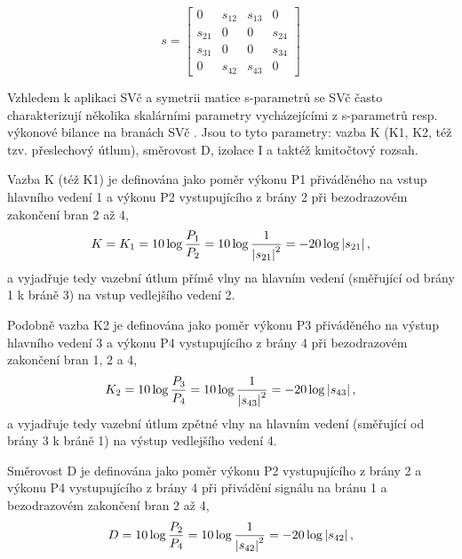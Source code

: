        \begin{equation}\label{RA:eq_smith09}
          s = \left[
            \begin{matrix}
                0    & s_{12} & s_{13} &  0       \\
              s_{21} &   0    &   0    & s_{24}   \\
              s_{31} &   0    &   0    & s_{34}   \\
                0    & s_{42} & s_{43} &  0     
            \end{matrix}
              \right]
        \end{equation} 
  
        Vzhledem k aplikaci SVč a symetrii matice s-parametrů se SVč často charakterizují několika skalárními 
        parametry vycházejícími z s-parametrů resp. výkonové bilance na branách SVč . Jsou to tyto parametry: 
        vazba K (K1, K2, též tzv. přeslechový útlum), směrovost D, izolace I a taktéž kmitočtový rozsah.
  
        Vazba K (též K1) je definována jako poměr výkonu P1 přiváděného na vstup hlavního vedení 1 a výkonu 
        P2 vystupujícího z brány 2 při bezodrazovém zakončení bran 2 až 4,
        \begin{equation}\label{RA:eq_smith10}
          K = K_1 = 10\log\frac{P_1}{P_2} 
                  = 10\log\frac{1}{\left\lvert s_{21}\right\rvert^2} = -20\log\left\lvert s_{21}\right\rvert,  
        \end{equation} 
        a vyjadřuje tedy vazební útlum přímé vlny na hlavním vedení (směřující od brány 1 k bráně 3) na vstup 
        vedlejšího vedení 2.
  
        Podobně vazba K2 je definována jako poměr výkonu P3 přiváděného na výstup hlavního vedení 3 a výkonu 
        P4 vystupujícího z brány 4 při bezodrazovém zakončení bran 1, 2 a 4,
        \begin{equation}\label{RA:eq_smith11}
          K_2 = 10\log\frac{P_3}{P_4} 
              = 10\log\frac{1}{\left\lvert s_{43}\right\rvert^2} = -20\log\left\lvert s_{43}\right\rvert,  
        \end{equation} 
        a vyjadřuje tedy vazební útlum zpětné vlny na hlavním vedení (směřující od brány 3 k bráně 1) na 
        výstup vedlejšího vedení 4.
  
        Směrovost D je definována jako poměr výkonu P2 vystupujícího z brány 2 a výkonu P4 vystupujícího z 
        brány 4 při přivádění signálu na bránu 1 a bezodrazovém zakončení bran 2 až 4,
        \begin{equation}\label{RA:eq_smith12}
          D = 10\log\frac{P_2}{P_4} 
            = 10\log\frac{1}{\left\lvert s_{42}\right\rvert^2} = -20\log\left\lvert s_{42}\right\rvert,  
        \end{equation} 
  
